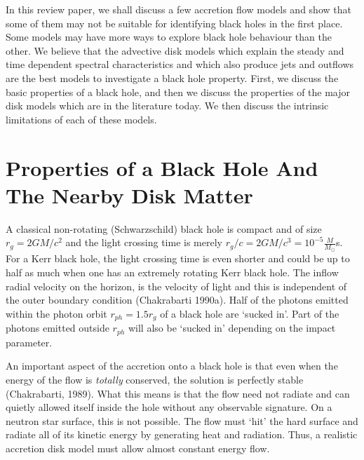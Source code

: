 \documentclass{ws-procs975x65}
\begin{document}
In this review paper, we shall discuss a few accretion flow models and show that 
some of them may not be suitable for identifying black holes in the first place. Some models may  
have more ways to explore black hole behaviour than the other. We believe that 
the advective disk models which explain the steady and time dependent spectral 
characteristics and which also produce jets and outflows are the best models
to investigate a black hole property. First, we discuss the basic properties of 
a black hole, and then we discuss the properties of the major disk models 
which are in the literature today. We then discuss the intrinsic limitations
of each of these models.

\section{Properties of a Black Hole And The Nearby Disk Matter}

A classical non-rotating (Schwarzschild) black hole is compact and of size $r_g=2GM/c^2$
and the light crossing time is merely $r_g/c=2GM/c^3=10^{-5}\frac{M}{M_\odot}$s. 
For a Kerr black hole, the light crossing time is even shorter and could be up to half as
much when one has an extremely rotating Kerr black hole. The inflow radial velocity
on the horizon, is the velocity of light and this is independent of the outer boundary 
condition (Chakrabarti 1990a). Half of the photons emitted within the photon orbit 
$r_{ph}=1.5r_g$ of a black hole are `sucked in'. Part of the photons emitted outside 
$r_{ph}$ will also be `sucked in' depending on the impact parameter. 

An important aspect of the accretion onto a black hole is that even when the energy of the flow is 
{\it totally} conserved, the solution is perfectly stable (Chakrabarti, 1989). What this means 
is that the flow need not radiate and can quietly allowed itself inside the hole without any 
observable signature. On a neutron star surface, this is not possible. The flow must `hit' the
hard surface and radiate all of its kinetic energy by generating heat and radiation. Thus, a realistic 
accretion disk model must allow almost constant energy flow. 
\end{document}
